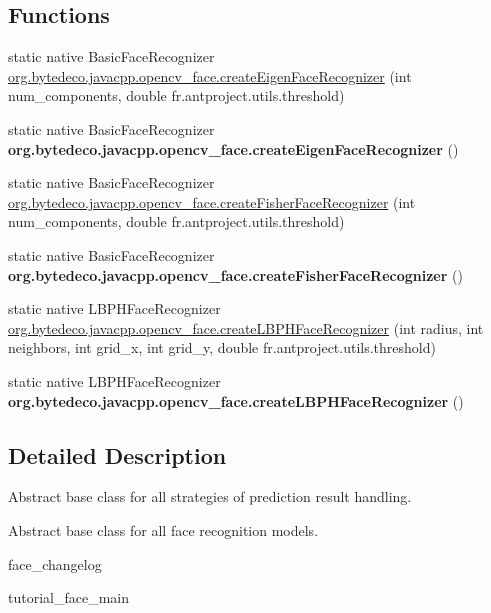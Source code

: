 \subsection*{Functions}
\begin{DoxyCompactItemize}
\item 
static native Basic\+Face\+Recognizer \hyperlink{group__face_ga6f3a56396530d46af3fba9ad04fc80cf}{org.\+bytedeco.\+javacpp.\+opencv\+\_\+face.\+create\+Eigen\+Face\+Recognizer} (int num\+\_\+components, double fr.antproject.utils.threshold)
\item 
\mbox{\label{group__face_gac70e2c94b7d6f05d26f762bed96b2da7}} 
static native Basic\+Face\+Recognizer {\bfseries org.\+bytedeco.\+javacpp.\+opencv\+\_\+face.\+create\+Eigen\+Face\+Recognizer} ()
\item 
static native Basic\+Face\+Recognizer \hyperlink{group__face_ga80a98f353dd2ef661444e0d79bbe9daf}{org.\+bytedeco.\+javacpp.\+opencv\+\_\+face.\+create\+Fisher\+Face\+Recognizer} (int num\+\_\+components, double fr.antproject.utils.threshold)
\item 
\mbox{\label{group__face_ga241cb766e32721cf0ba5c6fde7006808}} 
static native Basic\+Face\+Recognizer {\bfseries org.\+bytedeco.\+javacpp.\+opencv\+\_\+face.\+create\+Fisher\+Face\+Recognizer} ()
\item 
static native L\+B\+P\+H\+Face\+Recognizer \hyperlink{group__face_ga970c161034e055fb56615aadba87ac4e}{org.\+bytedeco.\+javacpp.\+opencv\+\_\+face.\+create\+L\+B\+P\+H\+Face\+Recognizer} (int radius, int neighbors, int grid\+\_\+x, int grid\+\_\+y, double fr.antproject.utils.threshold)
\item 
\mbox{\label{group__face_ga6d5f6361f7aeeb413b5e582ac60ae6e5}} 
static native L\+B\+P\+H\+Face\+Recognizer {\bfseries org.\+bytedeco.\+javacpp.\+opencv\+\_\+face.\+create\+L\+B\+P\+H\+Face\+Recognizer} ()
\end{DoxyCompactItemize}


\subsection{Detailed Description}
Abstract base class for all strategies of prediction result handling. 

Abstract base class for all face recognition models.


\begin{DoxyItemize}
\item face\+\_\+changelog
\item tutorial\+\_\+face\+\_\+main 
\end{DoxyItemize}

